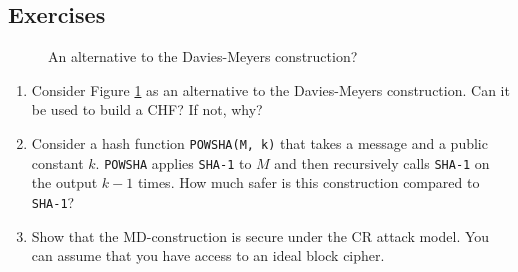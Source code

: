 \subsection*{Exercises}
\begin{figure}[htb]
\centering
{}
    \caption{An alternative to the Davies-Meyers construction?}
    \label{fig:dm-alt-construction}
\end{figure}

\begin{enumerate}[label=\textbf{Exercise \thesection.\arabic*}, wide=0pt]
    \item Consider Figure \ref{fig:dm-alt-construction} as an alternative to the Davies-Meyers construction. Can it be used to build a CHF? If not, why?
    \item Consider a hash function \texttt{POWSHA(M, k)} that takes a message and a public constant $k$. \texttt{POWSHA} applies \texttt{SHA-1} to $M$ and then recursively calls \texttt{SHA-1} on the output $k-1$ times. How much safer is this construction compared to \texttt{SHA-1}?
    \item Show that the MD-construction is secure under the CR attack model. You can assume that you have access to an ideal block cipher.
\end{enumerate}


